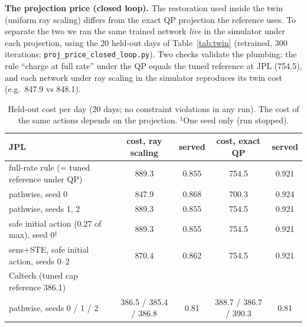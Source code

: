 \documentclass[10pt]{article}
\begin{document}
\textbf{The projection price (closed loop).}\label{sec:pp} The restoration used inside the twin (uniform ray scaling) differs from the exact QP projection the reference uses. To separate the two we ran the same trained network \emph{live} in the simulator under each projection, using the 20 held-out days of Table~\ref{tab:twin} (retrained, 300 iterations; \texttt{proj\_price\_closed\_loop.py}). Two checks validate the plumbing: the rule ``charge at full rate'' under the QP equals the tuned reference at JPL (754.5), and each network under ray scaling in the simulator reproduces its twin cost (e.g.\ 847.9 vs 848.1).
\begin{table}[h]\centering\small\begin{tabular}{lcccc}
JPL & cost, ray scaling & served & cost, exact QP & served\\\hline
full-rate rule (= tuned reference under QP) & 889.3 & 0.855 & 754.5 & 0.921\\
pathwise, seed 0 & 847.9 & 0.868 & 700.3 & 0.924\\
pathwise, seeds 1, 2 & 889.3 & 0.855 & 754.5 & 0.921\\
safe initial action (0.27 of max), seed 0$^\ddagger$ & 889.3 & 0.855 & 754.5 & 0.921\\
sens+STE, safe initial action, seeds 0--2 & 870.4 & 0.862 & 754.5 & 0.921\\\hline
Caltech (tuned cap reference 386.1) & & & &\\
pathwise, seeds 0 / 1 / 2 & 386.5 / 385.4 / 386.8 & 0.81 & 388.7 / 386.7 / 390.3 & 0.81
\end{tabular}\caption{Held-out cost per day (20 days; no constraint violations in any run). The cost of the same actions depends on the projection. $^\ddagger$One seed only (run stopped).}\label{tab:pp}\end{table}
\end{document}
